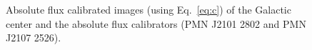 \documentclass[a4paper,10pt]{article}
\begin{document}
\begin{figure}
\centering
{}
\caption{Absolute flux calibrated images (using Eq.~\eqref{eq:c}) of the Galactic center and the absolute flux calibrators (PMN J2101 2802 and PMN J2107 2526). \label{fig:sources}} 
\end{figure}
\end{document}
